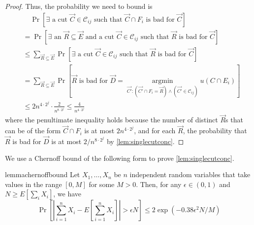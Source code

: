 \documentclass[11pt,a4paper]{article}
\newcommand{\argmin}{\operatorname*{argmin}}
\newcommand{\abs}[1]{\ensuremath{\left| #1 \right|}}
\newcommand{\eps}{\epsilon}
\begin{document}
\begin{proof}
Thus, the probability we need to bound is
\begin{align*}
&\ \ \ \ \, \Pr [\text{$\exists$ a cut $\vec{C} \in \mathcal C_{ij}$ such that $\vec{C} \cap F_i$ is bad for $\vec{C}$}] \\
&= \Pr [\text{$\exists$ an $\vec{R} \subseteq \vec{E}$ and a cut $\vec{C} \in \mathcal C_{ij}$ such that $\vec{R}$ is bad for $\vec{C}$}] \\
&\le \sum_{\vec{R} \subseteq \vec{E}} \Pr[\text{$\exists$ a cut $\vec{C} \in \mathcal C_{ij}$ such that $\vec{R}$ is bad for $\vec{C}$}] \\
&= \sum_{\vec{R} \subseteq \vec{E}} \Pr[\text{$\vec{R}$ is bad for $\vec{D} = \argmin_{\vec{C'}: (\vec{C'} \cap F_i = \vec{R}) \land (\vec{C'} \in \mathcal C_{ij})} u(C \cap E_i)$}] \\
&\le 2 n^{4 \cdot 2^j} \cdot \frac{2}{n^{8\cdot 2^j}}
\le \frac{4}{n^{4\cdot 2^j}}
\end{align*}
where the penultimate inequality holds because the number of distinct $\vec{R}$s that can be of the form $\vec{C} \cap F_i$ is at most $2 n^{4 \cdot 2^{j}}$, and for each $\vec{R}$, the probability that $\vec{R}$ is bad for $\vec{D}$ is at most $2/n^{8 \cdot 2^j}$ by \cref{lem:singlecutconc}.
\end{proof}

We use a Chernoff bound of the following form to prove \cref{lem:singlecutconc}.

\begin{restatable}{lemma}{chernoffbound}
\label{lem:chernoffbound}
Let $X_1, \ldots, X_n$ be $n$ independent random variables that take values in the range $[0,M]$ for some $M > 0$.
Then, for any $\eps \in (0, 1)$ and $N \ge E[\sum_i X_i]$, we have
\[
\Pr \left[ \abs{\sum_{i=1}^n X_i - E\left[ \sum_{i=1}^n X_i \right]} > \eps N \right]
\le 2 \exp(- 0.38 \eps^2 N / M)
\]
\end{restatable}
\end{document}
